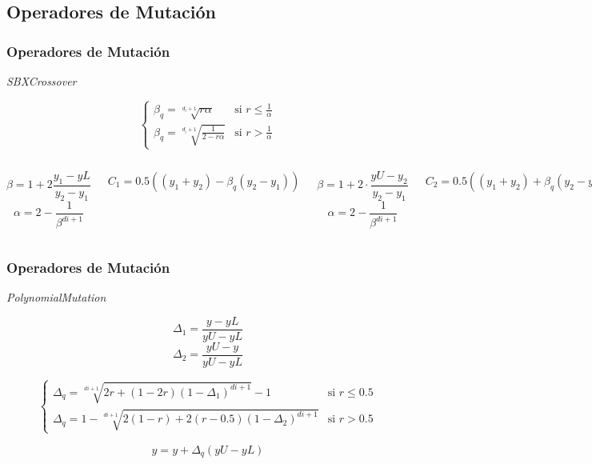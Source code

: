 \documentclass[9pt]{beamer}
\begin{document}
    \subsection{Operadores de Mutación}
    \begin{frame}
        \frametitle{Operadores de Mutación}
        \textit{SBXCrossover}

        $$
        \begin{cases} 
        \beta_q=\sqrt[d_i+1]{r\alpha} & \text{si $r\leq \frac{1}{\alpha}$} \\ 
        \beta_q=\sqrt[d_i+1]{\frac{1}{2-r\alpha}} &  \text{si $r > \frac{1}{\alpha}$}
        \end{cases}
        $$

        
        \begin{columns}
            $$\beta = 1 + 2\frac{y_1-yL}{y_2-y_1}$$
            $$\alpha = 2 - \frac{1}{\beta^{di+1}}$$
    
            $$C_1 = 0.5 ((y_1+y_2)-\beta_q(y_2-y_1))$$
           
            $$\beta = 1 + 2 \cdot \frac{yU-y_2}{y_2-y_1}$$
            $$\alpha = 2 - \frac{1}{\beta^{di+1}}$$
    
            $$C_2 = 0.5 ((y_1+y_2)+\beta_q(y_2-y_1))$$
        \end{columns}

    \end{frame}
    \begin{frame}
        \frametitle{Operadores de Mutación}
        \textit{PolynomialMutation}

        $$\Delta_1 = \frac{y-yL}{yU-yL}$$
        $$\Delta_2 = \frac{yU-y}{yU-yL}$$

        $$
        \begin{cases} 
        \Delta_q = \sqrt[di+1]{2r+(1-2r)(1-\Delta_{1})^{di+1}} - 1 & \text{si $r\leq 0.5$} \\ 
        \Delta_q = 1 - \sqrt[di+1]{2(1-r)+2(r-0.5)(1-\Delta_{2})^{di+1}} &  \text{si $r > 0.5$}
        \end{cases}
        $$

        $$y = y + \Delta_q(yU-yL)$$
    \end{frame}
\end{document}
